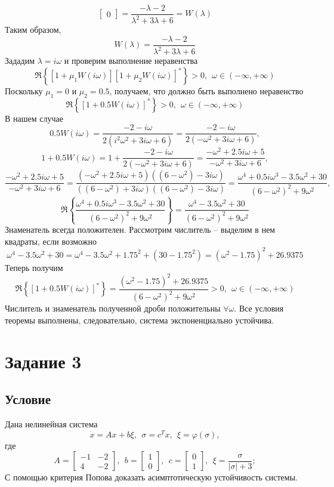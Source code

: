 \documentclass[a4paper, 12pt]{article}
\begin{document}
\begin{compactitem}
$$\begin{bmatrix}
            0
        \end{bmatrix}=
        \dfrac{-\lambda-2}{\lambda^2+3\lambda+6}=W(\lambda)
        $$
        Таким образом, $$W(\lambda)=\dfrac{-\lambda-2}{\lambda^2+3\lambda+6}$$
        Зададим $\lambda=i\omega$ и проверим выполнение неравенства
        $$\Re\left\{\left[1+\mu_1W(i\omega)\right]\left[1+\mu_2W(i\omega)\right]^*\right\}>0,\ \ \omega\in(-\infty,+\infty)$$
        Поскольку $\mu_1=0$ и $\mu_2=0.5$, получаем, что должно быть выполнено неравенство
        $$\Re\left\{\left[1+0.5W(i\omega)\right]^*\right\}>0,\ \ \omega\in(-\infty,+\infty)$$
        В нашем случае $$0.5W(i\omega)=\dfrac{-2-i\omega}{2\left(i^2\omega^2+3i\omega+6\right)}=\dfrac{-2-i\omega}{2\left(-\omega^2+3i\omega+6\right)},$$
        $$1+0.5W(i\omega)=1+\dfrac{-2-i\omega}{2\left(-\omega^2+3i\omega+6\right)}=\dfrac{-\omega^2+2.5i\omega+5}{-\omega^2+3i\omega+6},$$
        $$\dfrac{-\omega^2+2.5i\omega+5}{-\omega^2+3i\omega+6}=\dfrac{(-\omega^2+2.5i\omega+5)((6-\omega^2)-3i\omega)}{((6-\omega^2)+3i\omega)((6-\omega^2)-3i\omega)}=
        \dfrac{\omega^4+0.5i\omega^3-3.5\omega^2+30}{(6-\omega^2)^2+9\omega^2},$$
        $$\Re\left\{\dfrac{\omega^4+0.5i\omega^3-3.5\omega^2+30}{(6-\omega^2)^2+9\omega^2}\right\}=\dfrac{\omega^4-3.5\omega^2+30}{(6-\omega^2)^2+9\omega^2}$$
        Знаменатель всегда положителен. Рассмотрим числитель -- выделим в нем квадраты, если возможно
        $$\omega^4-3.5\omega^2+30=\omega^4-3.5\omega^2+1.75^2+(30-1.75^2)=(\omega^2-1.75)^2+26.9375$$
        Теперь получим
        $$\Re\left\{\left[1+0.5W(i\omega)\right]^*\right\}=\dfrac{(\omega^2-1.75)^2+26.9375}{(6-\omega^2)^2+9\omega^2}>0,\ \ \omega\in(-\infty,+\infty)$$
        Числитель и знаменатель полученной дроби положительны $\forall\omega$. Все условия теоремы выполнены,
        следовательно, система экспоненциально устойчива.
    \end{compactitem}


    \section{Задание 3}
    \subsection{Условие}
    Дана нелинейная система
    $$
    \dot{x}=Ax+b\xi,\ \ \sigma=c^Tx,\ \ \xi=\varphi(\sigma),
    $$
    где
    $$
    A=
    \begin{bmatrix}
        -1 & -2\\
        4 & -2
    \end{bmatrix},\ \
    b=
    \begin{bmatrix}
        1\\
        0
    \end{bmatrix},\ \
    c=
    \begin{bmatrix}
        0\\
        1
    \end{bmatrix},\ \
    \xi=
    \dfrac{\sigma}{|\sigma|+3};
    $$
    С помощью критерия Попова доказать асимптотическую устойчивость системы.
\end{document}
